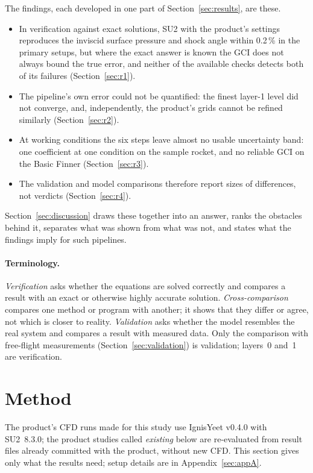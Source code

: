 \documentclass[twocolumn]{labreport}
\begin{document}
The findings, each developed in one part of Section~\ref{sec:results}, are these.
\begin{itemize}
\item In verification against exact solutions, SU2 with the product's settings reproduces the inviscid surface pressure and shock angle within 0.2\,\% in the primary setups, but where the exact answer is known the GCI does not always bound the true error, and neither of the available checks detects both of its failures (Section~\ref{sec:r1}).
\item The pipeline's own error could not be quantified: the finest layer-1 level did not converge, and, independently, the product's grids cannot be refined similarly (Section~\ref{sec:r2}).
\item At working conditions the six steps leave almost no usable uncertainty band: one coefficient at one condition on the sample rocket, and no reliable GCI on the Basic Finner (Section~\ref{sec:r3}).
\item The validation and model comparisons therefore report sizes of differences, not verdicts (Section~\ref{sec:r4}).
\end{itemize}
Section~\ref{sec:discussion} draws these together into an answer, ranks the obstacles behind it, separates what was shown from what was not, and states what the findings imply for such pipelines.

\paragraph{Terminology.}
\emph{Verification} asks whether the equations are solved correctly and compares a result with an exact or otherwise highly accurate solution.
\emph{Cross-comparison} compares one method or program with another; it shows that they differ or agree, not which is closer to reality.
\emph{Validation} asks whether the model resembles the real system and compares a result with measured data.
Only the comparison with free-flight measurements (Section~\ref{sec:validation}) is validation; layers~0 and~1 are verification.

\section{Method}
\label{sec:method}

The product's CFD runs made for this study use IgnisYeet v0.4.0 with SU2~8.3.0; the product studies called \emph{existing} below are re-evaluated from result files already committed with the product, without new CFD.
This section gives only what the results need; setup details are in Appendix~\ref{sec:appA}.
\end{document}
